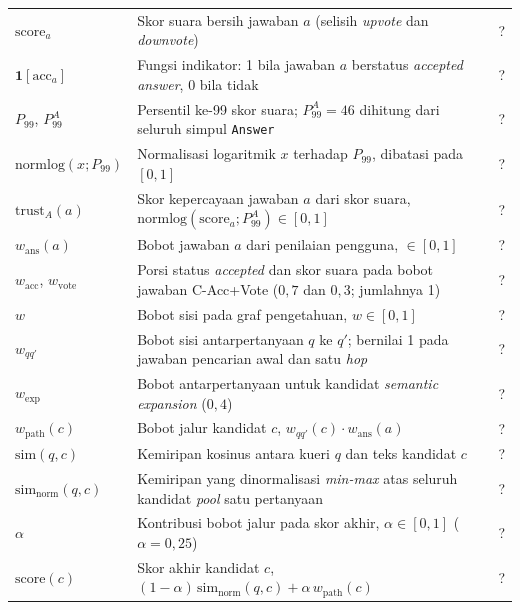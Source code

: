 \begin{longtable}{@{} l >{\raggedright\arraybackslash}p{6.5cm} c @{}}
$\mathrm{score}_a$ & Skor suara bersih jawaban $a$ (selisih \emph{upvote} dan \emph{downvote}) & ? \\
$\mathbf{1}[\mathrm{acc}_a]$ & Fungsi indikator: 1 bila jawaban $a$ berstatus \emph{accepted answer}, 0 bila tidak & ? \\
$P_{99}$, $P_{99}^{A}$ & Persentil ke-99 skor suara; $P_{99}^{A}=46$ dihitung dari seluruh simpul \texttt{Answer} & ? \\
$\mathrm{normlog}(x;P_{99})$ & Normalisasi logaritmik $x$ terhadap $P_{99}$, dibatasi pada $[0,1]$ & ? \\
$\mathrm{trust}_A(a)$ & Skor kepercayaan jawaban $a$ dari skor suara, $\mathrm{normlog}(\mathrm{score}_a;P_{99}^{A})\in[0,1]$ & ? \\
$w_{\mathrm{ans}}(a)$ & Bobot jawaban $a$ dari penilaian pengguna, $\in[0,1]$ & ? \\
$w_{\mathrm{acc}}$, $w_{\mathrm{vote}}$ & Porsi status \emph{accepted} dan skor suara pada bobot jawaban C-Acc+Vote ($0{,}7$ dan $0{,}3$; jumlahnya 1) & ? \\
$w$ & Bobot sisi pada graf pengetahuan, $w\in[0,1]$ & ? \\
$w_{qq'}$ & Bobot sisi antarpertanyaan $q$ ke $q'$; bernilai 1 pada jawaban pencarian awal dan satu \emph{hop} & ? \\
$w_{\mathrm{exp}}$ & Bobot antarpertanyaan untuk kandidat \emph{semantic expansion} ($0{,}4$) & ? \\
$w_{\mathrm{path}}(c)$ & Bobot jalur kandidat $c$, $w_{qq'}(c)\cdot w_{\mathrm{ans}}(a)$ & ? \\[1ex]


$\mathrm{sim}(q,c)$ & Kemiripan kosinus antara kueri $q$ dan teks kandidat $c$ & ? \\
$\mathrm{sim}_{\mathrm{norm}}(q,c)$ & Kemiripan yang dinormalisasi \emph{min-max} atas seluruh kandidat \emph{pool} satu pertanyaan & ? \\
$\alpha$ & Kontribusi bobot jalur pada skor akhir, $\alpha\in[0,1]$ ($\alpha=0{,}25$) & ? \\
$\mathrm{score}(c)$ & Skor akhir kandidat $c$, $(1-\alpha)\,\mathrm{sim}_{\mathrm{norm}}(q,c)+\alpha\,w_{\mathrm{path}}(c)$ & ? \\[1ex]



\end{longtable}
